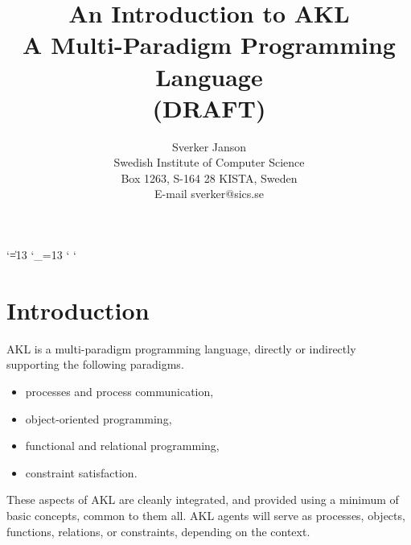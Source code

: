 
\parindent=0pt
\parskip=6pt

\def\inp{\it}
\def\progf{}

\begingroup
\catcode`\|=13
\catcode`\_=13
\catcode`
\catcode`

\gdef\prog{\progf%
\catcode`\|=13%
\def|{$\mid$}%
\catcode`\_=13%
\def_{\ifmmode\else\_\fi}%
\catcode`\<=13%
\def<{\ifmmode\char`\<\else$<$\fi}%
\catcode`\>=13%
\def>{\ifmmode\char`\>\else$>$\fi}%
}
\endgroup

\def\sub#1{$#1$}

\newenvironment{program}{%
\begingroup%
\prog%
\obeylines%
\def\nl{\\[\medskipamount]}%
\begin{tabbing}%
\hskip1cm\=\hskip1cm\=\hskip1cm\=\hskip1cm\=\hskip1cm\=\hskip1cm\=\kill}{%
\end{tabbing}\endgroup\noindent}

\newenvironment{progex}{%
\begingroup%
\prog%
\def\nl{\\[\medskipamount]}%
\begin{tabbing}%
\hskip1cm\hskip1cm\=\+\hskip1cm\=\hskip1cm\=\hskip1cm\=\hskip1cm\=\kill}{%
\end{tabbing}\endgroup\noindent}

\def\c#1{\mbox{#1}}
\def\cond{$\rightarrow$}

\def\nonterm#1{\langle\mbox{\em #1\/}\rangle}
\def\nt#1{\ifmmode\nonterm{#1}\else$\nonterm{#1}$\fi}

\title{An Introduction to AKL\\
A Multi-Paradigm Programming Language\\
(DRAFT)}
\author{Sverker Janson\\
Swedish Institute of Computer Science\\
Box 1263, S-164 28 KISTA, Sweden\\
E-mail sverker@sics.se}



\maketitle

\section{Introduction}

AKL is a multi-paradigm programming language, directly or indirectly
supporting the following paradigms.
%
\begin{itemize}
\item	processes and process communication,
\item	object-oriented programming,
\item	functional and relational programming,
\item	constraint satisfaction.
\end{itemize}
%
These aspects of AKL are cleanly integrated, and provided using a
minimum of basic concepts, common to them all.  AKL agents will serve
as processes, objects, functions, relations, or constraints, depending
on the context.

